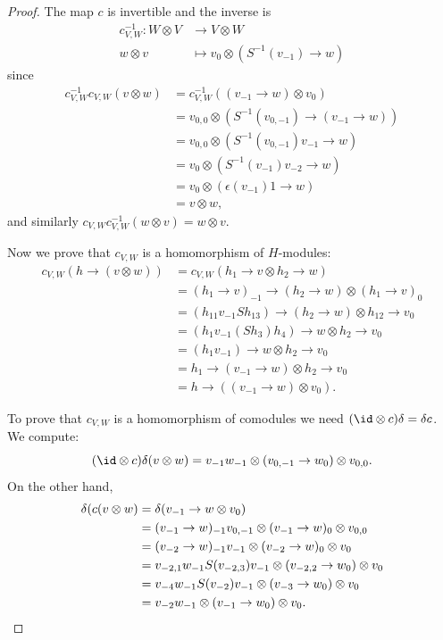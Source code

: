 \begin{proof}
The map $c$ is invertible and the inverse is 
\begin{align*}
c_{V,W}^{-1}:W\otimes V & \to V\otimes W\\
w\otimes v & \mapsto v_{0}\otimes(S^{-1}(v_{-1})\to w)
\end{align*}
since
\begin{align*}
c_{V,W}^{-1}c_{V,W}(v\otimes w) & =c_{V,W}^{-1}((v_{-1}\to w)\otimes v_{0})\\
 & =v_{0,0}\otimes(S^{-1}(v_{0,-1})\to(v_{-1}\to w))\\
 & =v_{0,0}\otimes(S^{-1}(v_{0,-1})v_{-1}\to w)\\
 & =v_{0}\otimes(S^{-1}(v_{-1})v_{-2}\to w)\\
 & =v_{0}\otimes(\epsilon(v_{-1})1\to w)\\
 & =v\otimes w,
\end{align*}
and similarly $c_{V,W}c_{V,W}^{-1}(w\otimes v)=w\otimes v$. 

Now we prove that $c_{V,W}$ is a homomorphism of $H$-modules: 
\begin{align*}
c_{V,W}(h\rightarrow (v\otimes w))&=c_{V,W}(h_1\rightarrow v\otimes h_2\rightarrow w)\\
&= (h_1\rightarrow v)_{-1}\rightarrow(h_2\rightarrow w)\otimes(h_1\rightarrow v)_0\\
&=(h_{11}v_{-1}Sh_{13})\rightarrow(h_2\rightarrow w)\otimes h_{12}\rightarrow v_0\\
&=(h_1v_{-1}(Sh_3)h_4)\rightarrow w\otimes h_2\rightarrow v_0\\
&=(h_1v_{-1})\rightarrow w\otimes h_2\rightarrow v_0\\
&=h_1\rightarrow(v_{-1}\rightarrow w)\otimes h_2\rightarrow v_0\\
&=h\rightarrow((v_{-1}\rightarrow w)\otimes v_0).
\end{align*}

To prove that $c_{V,W}$ is a homomorphism of comodules we need $(\id\otimes
c)\delta=\delta c$.  We compute:
\[
(\id\otimes c)\delta(v\otimes w)=v_{-1}w_{-1}\otimes (v_{0,-1}\rightarrow w_0)\otimes v_{0,0}.
\]
On the other hand,
\begin{align*}
\delta(c(v\otimes w)&=\delta(v_{-1}\rightarrow w\otimes v_0)\\
&=(v_{-1}\rightarrow w)_{-1}v_{0,-1}\otimes(v_{-1}\rightarrow w)_0\otimes v_{0,0}\\
&=(v_{-2}\rightarrow w)_{-1}v_{-1}\otimes (v_{-2}\rightarrow w)_0\otimes v_0\\
&=v_{-2,1}w_{-1}S(v_{-2,3})v_{-1}\otimes(v_{-2,2}\rightarrow w_0)\otimes v_0\\
&=v_{-4}w_{-1}S(v_{-2})v_{-1}\otimes (v_{-3}\rightarrow w_0)\otimes v_0\\
&=v_{-2}w_{-1}\otimes(v_{-1}\rightarrow w_0)\otimes v_0.\qedhere
\end{align*}
\end{proof}

